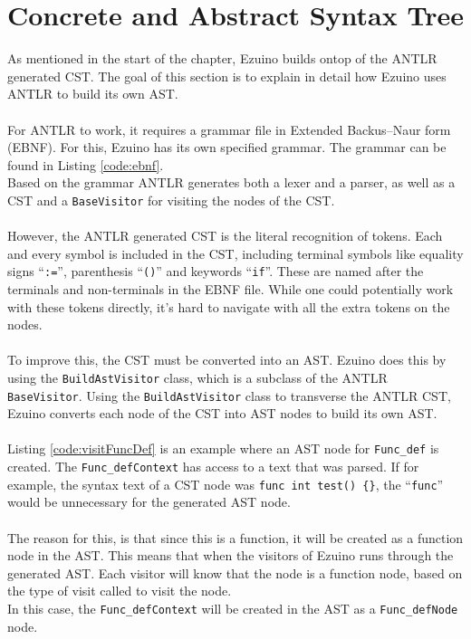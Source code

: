 \section{Concrete and Abstract Syntax Tree}
As mentioned in the start of the chapter, Ezuino builds ontop of the ANTLR generated CST. The goal of this section is to explain in detail how Ezuino uses ANTLR to build its own AST.
\\\\
For ANTLR to work, it requires a grammar file in Extended Backus–Naur form (EBNF). For this, Ezuino has its own specified grammar. The grammar can be found in Listing \ref{code:ebnf}.\\
Based on the grammar ANTLR generates both a lexer and a parser, as well as a CST and a \texttt{BaseVisitor} for visiting the nodes of the CST.
\\\\
However, the ANTLR generated CST is the literal recognition of tokens. Each and every symbol is included in the CST, including terminal symbols like equality signs “\texttt{:=}”, parenthesis “\texttt{()}” and keywords “\texttt{if}”. These are named after the terminals and non-terminals in the EBNF file. While one could potentially work with these tokens directly, it’s hard to navigate with all the extra tokens on the nodes.
\\\\
To improve this, the CST must be converted into an AST. Ezuino does this by using the \texttt{BuildAstVisitor} class, which is a subclass of the ANTLR \texttt{BaseVisitor}. Using the \texttt{BuildAstVisitor} class to transverse the ANTLR CST, Ezuino converts each node of the CST into AST nodes to build its own AST.
\\\\
Listing \ref{code:visitFuncDef} is an example where an AST node for \texttt{Func\_def} is created. The \texttt{Func\_defContext} has access to a text that was parsed. If for example, the syntax text of a CST node was \texttt{func int test() \{\}}, the “\texttt{func}” would be unnecessary for the generated AST node.
\\\\
The reason for this, is that since this is a function, it will be created as a function node in the AST. This means that when the visitors of Ezuino runs through the generated AST. Each visitor will know that the node is a function node, based on the type of visit called to visit the node.\\
In this case, the \texttt{Func\_defContext} will be created in the AST as a \texttt{Func\_defNode} node.
